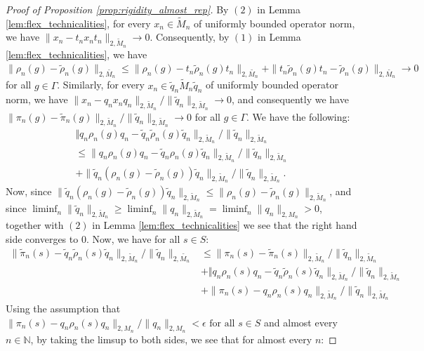 \documentclass[11pt]{amsart}
\newcommand{\N}{{\mathbb{N}}}
\theoremstyle{definition}
\theoremstyle{remark}
\theoremstyle{definition}
\begin{document}
\begin{proof}[Proof of Proposition \ref{prop:rigidity_almost_rep}]
    By  $(2)$ in Lemma \ref{lem:flex_technicalities}, for every $x_n \in \widetilde{M}_n$ of uniformly bounded operator norm, we have $ \| x_n -   t_n x_n t_n \|_{2, \widetilde{M}_n} \to 0$. 
    Consequently, by $(1)$ in Lemma \ref{lem:flex_technicalities}, we have  $\| \rho_n(g) - \tilde \rho_n(g) \|_{2, \widetilde{M_n}} \leq \| \rho_n(g) -  t_n \tilde \rho_n(g) t_n \|_{2, \widetilde{M_n}} + \|  t_n \tilde \rho_n(g) t_n - \tilde \rho_n(g) \|_{2, \widetilde{M_n}} \to 0$ for all $g \in \Gamma$.
    Similarly, for every $x_n \in \tilde q_n \widetilde{M}_n \tilde q_n$ of uniformly bounded operator norm, we have $ \| x_n -   q_n x_n q_n \|_{2, \widetilde{M}_n} / \| \tilde q_n\|_{2, \widetilde{M}_n} \to 0$,  and consequently we have $\| \pi_n(g) - \tilde \pi_n(g) \|_{2, \widetilde{M}_n} / \| \tilde q_n \|_{2,\widetilde{M}_n} \to 0$ for all $g \in \Gamma$.
    We have the following:
    \begin{multline*}
    \Vert q_n \rho_n(g) q_n- \tilde q_n\tilde \rho_n(g)\tilde q_n \|_{2,\widetilde{M}_n} / \|\tilde q_n \|_{2,\widetilde{M}_n}\\
    \leq \|q_n \rho_n(g) q_n - \tilde q_n \rho_n(g) \tilde q_n \|_{2,\widetilde{M}_n} / \| \tilde q_n \|_{2,\widetilde{M}_n} \\
    + \| \tilde q_n(\rho_n(g) - \tilde \rho_n(g))\tilde q_n\|_{2,\widetilde{M}_n} / \| \tilde q_n \|_{2,\widetilde{M}_n}.
    \end{multline*}
    Now, since $\| \tilde q_n(\rho_n(g) - \tilde \rho_n(g))\tilde q_n\|_{2,\widetilde{M}_n} \leq \| \rho_n(g) - \tilde \rho_n(g)\|_{2,\widetilde{M}_n}$,  and since $\liminf_n \|\widetilde{q}_n \|_{2, \widetilde{M}_n} \geq \liminf _n\|q_n \|_{2, \widetilde{M}_n} = \liminf _n\|q_n \|_{2, M_n}  > 0$, together with $(2)$ in Lemma \ref{lem:flex_technicalities} we see that the right hand side converges to $0$.
    Now, we have for all $s \in S$:
    \begin{align*}
        \|\tilde\pi_n(s) -\tilde q_n\tilde \rho_n(s) \tilde q_n\|_{2,\widetilde{M}_n} / \| \tilde q_n\|_{2, \widetilde{M_n} }&\leq  \| \pi_n(s) - \tilde \pi_n(s) \|_{2,\widetilde{M}_n} / \| \tilde q_n \|_{2,\widetilde{M}_n} \\
        &+ \Vert q_n \rho_n(s) q_n- \tilde q_n\tilde \rho_n(s)\tilde q_n \|_{2,\widetilde{M}_n} / \|\tilde q_n \|_{2,\widetilde{M}_n}\\
        &+ \| \pi_n(s) - q_n \rho_n(s) q_n \|_{2,\widetilde{M}_n} / \| \tilde q_n \|_{2,\widetilde{M}_n} 
    \end{align*}
    Using the assumption that $\| \pi_n(s) - q_n\rho_n(s) q_n\|_{2,M_n} / \|q_n \|_{2,M_n}< \epsilon \text{ for all $s \in S$}$ and almost every $n \in \N$, by taking the limsup to both sides, we see that for almost every $n$:

\end{proof}
\end{document}
